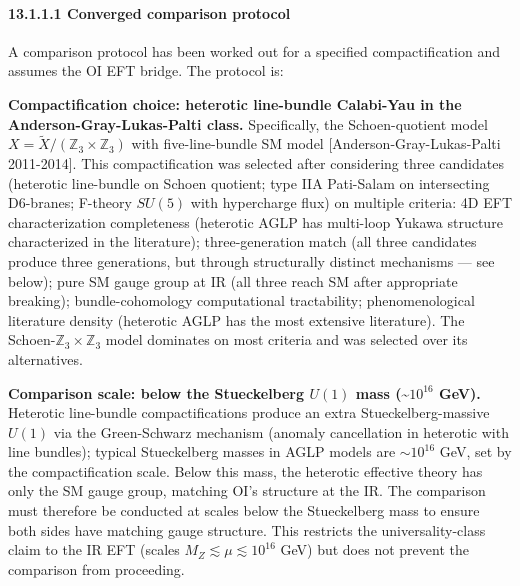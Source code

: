 \documentclass[
]{article}
\begin{document}
\hypertarget{converged-comparison-protocol}{%
\paragraph{13.1.1.1 Converged comparison
protocol}\label{converged-comparison-protocol}}

A comparison protocol has been worked out for a specified
compactification and assumes the OI EFT bridge. The protocol is:

\textbf{Compactification choice: heterotic line-bundle Calabi-Yau in the
Anderson-Gray-Lukas-Palti class.} Specifically, the Schoen-quotient
model \(X = \tilde{X}/(\mathbb{Z}_3 \times \mathbb{Z}_3)\) with
five-line-bundle SM model {[}Anderson-Gray-Lukas-Palti 2011-2014{]}.
This compactification was selected after considering three candidates
(heterotic line-bundle on Schoen quotient; type IIA Pati-Salam on
intersecting D6-branes; F-theory \(SU(5)\) with hypercharge flux) on
multiple criteria: 4D EFT characterization completeness (heterotic AGLP
has multi-loop Yukawa structure characterized in the literature);
three-generation match (all three candidates produce three generations,
but through structurally distinct mechanisms --- see below); pure SM
gauge group at IR (all three reach SM after appropriate breaking);
bundle-cohomology computational tractability; phenomenological
literature density (heterotic AGLP has the most extensive literature).
The Schoen-\(\mathbb{Z}_3 \times \mathbb{Z}_3\) model dominates on most
criteria and was selected over its alternatives.

\textbf{Comparison scale: below the Stueckelberg \(U(1)\) mass
(\textasciitilde{}\(10^{16}\) GeV).} Heterotic line-bundle
compactifications produce an extra Stueckelberg-massive \(U(1)\) via the
Green-Schwarz mechanism (anomaly cancellation in heterotic with line
bundles); typical Stueckelberg masses in AGLP models are
\(\sim 10^{16}\) GeV, set by the compactification scale. Below this
mass, the heterotic effective theory has only the SM gauge group,
matching OI's structure at the IR. The comparison must therefore be
conducted at scales below the Stueckelberg mass to ensure both sides
have matching gauge structure. This restricts the universality-class
claim to the IR EFT (scales \(M_Z \lesssim \mu \lesssim 10^{16}\) GeV)
but does not prevent the comparison from proceeding.
\end{document}
